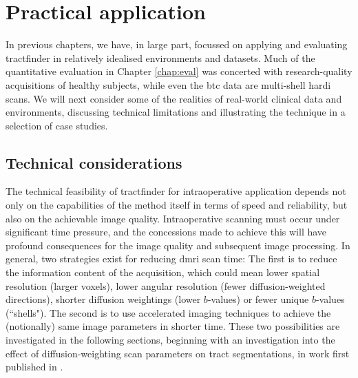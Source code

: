 \chapter{Practical application}
\label{chap:applications}

In previous chapters, we have, in large part, focussed on applying and evaluating tractfinder in relatively idealised environments and datasets.
Much of the quantitative evaluation in Chapter \ref{chap:eval} was concerted with research-quality acquisitions of healthy subjects, while even the \gls{btc} data are multi-shell \gls{hardi} scans.
We will next consider some of the realities of real-world clinical data and environments, discussing technical limitations and illustrating the technique in a selection of case studies.

\section{Technical considerations}\label{sec:technical}

The technical feasibility of tractfinder for intraoperative application depends not only on the capabilities of the method itself in terms of speed and reliability, but also on the achievable image quality.
Intraoperative scanning must occur under significant time pressure, and the concessions made to achieve this will have profound consequences for the image quality and subsequent image processing.
In general, two strategies exist for reducing \gls{dmri} scan time:
The first is to reduce the information content of the acquisition, which could mean lower spatial resolution (larger voxels), lower angular resolution (fewer diffusion-weighted directions), shorter diffusion weightings (lower $b$-values) or fewer unique $b$-values (``shells").
The second is to use accelerated imaging techniques to achieve the (notionally) same image parameters in shorter time.
These two possibilities are investigated in the following sections, beginning with an investigation into the effect of diffusion-weighting scan parameters on tract segmentations, in work first published in \textcite{Young2022a}.

